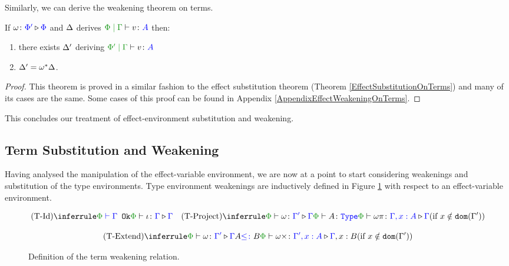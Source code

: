 Similarly, we can derive the weakening theorem on terms.


\begin{framed}
    \begin{theorem}\label{EffectWeakeningOnTerms}
        If $\omega \colon {\color{blue}\Phi'} \triangleright {\color {blue} \Phi}$ and $\Delta$ derives $\gpetyperelation{v}{A}$ then:
        \begin{enumerate}[label=\roman*.]
            \item there exists $\Delta'$ deriving $\etyperelation{\P'}{\G}{v}{A}$ 
            \item $\Delta' = \omega^*\Delta$.
        \end{enumerate}
    \end{theorem}
    
    \begin{proof}
        This theorem is proved in a similar fashion to the effect substitution theorem (Theorem \ref{EffectSubstitutionOnTerms}) and many of its cases are the same. Some cases of this proof can be found in Appendix \ref{AppendixEffectWeakeningOnTerms}.
    \end{proof}
\end{framed}

This concludes our treatment of effect-environment substitution and weakening.

\subsection{Term Substitution and Weakening}

Having analysed the manipulation of the effect-variable environment, we are now at a point to start considering weakenings and substitution of the type environments. Type environment weakenings are inductively defined in Figure \ref{TermWeakeningRelation} with respect to an effect-variable environment.


\begin{figure}[H]
    \centering
    \begin{framed}
        \[
            \ntreeruleI{\tid}{\wellformedok{\P}{\G}}{\pewrel{\i}{\G}{\G}}
            \quad  
            \condtreeruleII{\tproject}{\pewrel{\w}{\G'}{\G}}{\typerelation{\P}{A}{\type}}{\pewrel{\w \pi}{\G, x: A}{\G}}{x \notin \dom{\G'}}
        \]
        
        \[
            \condtreeruleII{\textend}{\pewrel{\w}{\G'}{\G}}{ A \subtype B}{\pewrel{\w \x}{\G', x: A}{\G, x: B}}{x \notin \dom{\G'}}
        \] 
    \end{framed}
    \caption{Definition of the term weakening relation.}
    \label{TermWeakeningRelation}
\end{figure}


